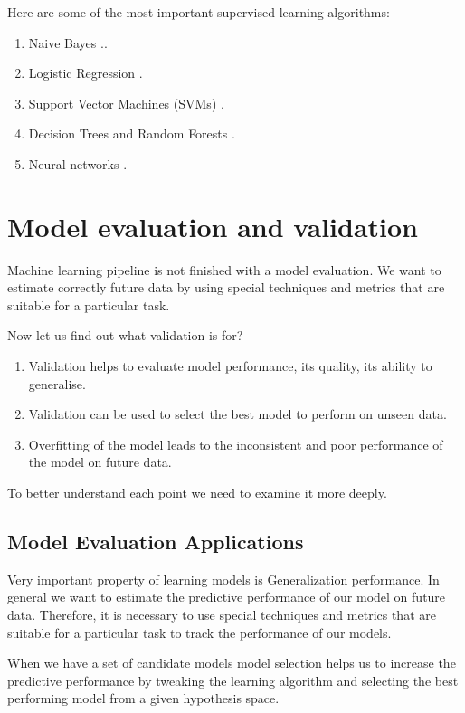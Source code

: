 \noindent Here are some of the most important supervised learning algorithms:
\begin{enumerate}
	\item Naive Bayes .\cite{NB1}.\cite{NB2}
	\item Logistic Regression .\cite{LR}
	\item Support Vector Machines (SVMs) .\cite{svm}
	\item Decision Trees and Random Forests .\cite{manning}
	\item Neural networks .\cite{manning}
\end{enumerate}


\section{Model evaluation and validation} \label{sect1_4}
Machine learning pipeline is not finished with a model evaluation. We want to estimate correctly future data by using special techniques and metrics that are suitable for a particular task.

Now let us find out what validation is for?
\begin{enumerate}
	\item Validation helps to evaluate model performance, its quality, its ability to generalise.
	\item Validation can be used to select the best model to perform on unseen data.
	\item Overfitting of the model leads to the inconsistent and poor performance of the model on future data.
\end{enumerate}

To better understand each point we need to examine it more deeply.

\subsection{Model Evaluation Applications}
Very important property of learning models is Generalization performance. In general we want to estimate the predictive performance of our model on future data.  Therefore, it is necessary to use special techniques and metrics that are suitable for a particular task to track the performance of our models. 

When we have a set of candidate models model selection helps us to increase the predictive performance by tweaking the learning algorithm and selecting the best performing model from a given hypothesis space.
 
